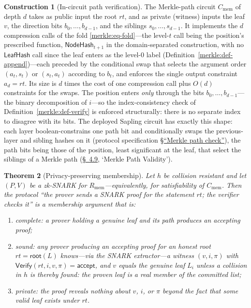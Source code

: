 \documentclass[11pt,a4paper]{article}
\newtheorem{theorem}{Theorem}[section]
\theoremstyle{definition}
\newtheorem{construction}[theorem]{Construction}
\theoremstyle{remark}
\begin{document}
\begin{construction}[In-circuit path verification]
\label{merkle:def-circuit}
The Merkle-path circuit \(C_{\mathrm{mem}}\) of depth \(d\) takes as
public input the root \(\mathit{rt}\), and as private (witness)
inputs the leaf \(v\), the direction bits \(b_0, \dots, b_{d-1}\),
and the siblings \(s_0, \dots, s_{d-1}\). It implements the \(d\)
compression calls of the fold \eqref{merkle:eq-fold}---the level-\(t\)
call being the position's prescribed function,
\(\mathsf{NodeHash}_{t+1}\) in the domain-separated construction,
with no \(\mathsf{LeafHash}\) call since the leaf enters as the
level-\(0\) label (Definition~\ref{merkle:def-append})---each
preceded by the conditional swap that selects the argument order
\((a_t, s_t)\) or \((s_t, a_t)\) according to \(b_t\), and enforces
the single output constraint \(a_d = \mathit{rt}\). Its size is
\(d\) times the cost of one compression call plus \(O(d)\)
constraints for the swaps. The position enters \emph{only} through the bits
\(b_0, \dots, b_{d-1}\)---the binary decomposition of \(i\)---so the
index-consistency check of Definition~\ref{merkle:def-verify} is
enforced structurally: there is no separate index to disagree with
its bits. The deployed Sapling circuit has exactly this shape: each
layer boolean-constrains one path bit and conditionally swaps the
previous-layer and sibling hashes on it (protocol specification
\href{https://zips.z.cash/protocol/protocol.pdf\#cctmerklepath}{\S``Merkle
path check''}), the path bits being those of the position, least
significant at the leaf, that select the siblings of a Merkle path
(\href{https://zips.z.cash/protocol/protocol.pdf\#merklepath}{\S~4.9},
`Merkle Path Validity').
\end{construction}

\begin{theorem}[Privacy-preserving membership]
\label{merkle:thm-zk-membership}
Let \(h\) be collision resistant and let \((P, V)\) be a zk-SNARK for
\(R_{\mathrm{mem}}\)---equivalently, for satisfiability of
\(C_{\mathrm{mem}}\). Then the protocol ``the prover sends a SNARK
proof for the statement \(\mathit{rt}\); the verifier checks it'' is
a membership argument that is:
\begin{enumerate}
\item \emph{complete}: a prover holding a genuine leaf and its path
  produces an accepting proof;
\item \emph{sound}: any prover producing an accepting proof for an
  honest root \(\mathit{rt} = \mathsf{root}(L)\) knows---via the
  SNARK extractor---a witness \((v, i, \pi)\) with
  \(\mathsf{Verify}(\mathit{rt}, i, v, \pi) = \mathsf{accept}\), and
  \(v\) equals the genuine leaf \(L_i\) unless a collision in \(h\)
  is thereby found: the proven leaf is a real member of the
  committed list;
\item \emph{private}: the proof reveals nothing about \(v\), \(i\),
  or \(\pi\) beyond the fact that some valid leaf exists under
  \(\mathit{rt}\).
\end{enumerate}
\end{theorem}
\end{document}
